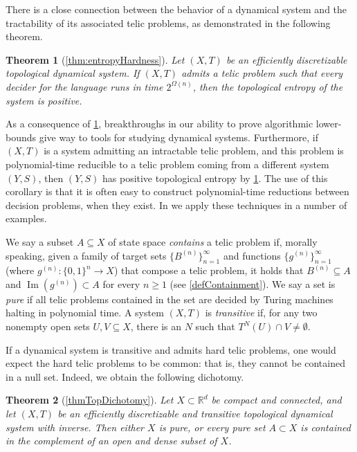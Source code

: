 \documentclass{amsart}
\theoremstyle{theorem}
\newtheorem{theorem}{Theorem}[section]
\theoremstyle{remark}
\numberwithin{equation}{section}
\DeclareMathOperator{\image}{Im}
\newcommand{\RR}{\mathbb{R}}
\begin{document}
There is a close connection between the behavior of a dynamical system and the tractability of its associated telic problems, as demonstrated in the following theorem.

\begin{theorem}[\cref{thm:entropyHardness}]\label{thm:entropyHardness1}
Let $(X, T)$ be an efficiently discretizable topological dynamical system. If $(X, T)$ admits a telic problem such that every decider for the language runs in time $2^{\Omega(n)}$, then the topological entropy of the system is positive.
\end{theorem}

As a consequence of \cref{thm:entropyHardness1}, breakthroughs in our ability to prove algorithmic lower-bounds give way to tools for studying dynamical systems.
Furthermore, if $(X, T)$ is a system admitting an intractable telic problem, and this problem is polynomial-time reducible to a telic problem coming from a different system $(Y, S)$, then $(Y, S)$ has positive topological entropy by \cref{thm:entropyHardness1}. The use of this corollary is that it is often easy to construct polynomial-time reductions between decision problems, when they exist.
In \cite{everett3} we apply these techniques in a number of examples.

We say a subset $A \subseteq X$ of state space \emph{contains} a telic problem if, morally speaking, given a family of target sets $\{B^{(n)}\}_{n=1}^\infty$ and functions $\{g^{(n)}\}_{n=1}^\infty$ (where $g^{(n)}:\{0,1\}^n\rightarrow X$) that compose a telic problem, it holds that $B^{(n)} \subseteq A$ and $\image(g^{(n)}) \subset A$ for every $n\geq 1$ (see \cref{defContainment}). We say a set is \emph{pure} if all telic problems contained in the set are decided by Turing machines halting in polynomial time. A system $(X, T)$ is \emph{transitive} if, for any two nonempty open sets $U, V \subseteq X$, there is an $N$ such that $T^N(U) \cap V \neq \emptyset$.

If a dynamical system is transitive and admits hard telic problems, one would expect the hard telic problems to be common: that is, they cannot be contained in a null set. Indeed, we obtain the following dichotomy.

\begin{theorem}[\cref{thmTopDichotomy}]\label{thmTopDichotomy1}
Let $X \subset \RR^d$ be compact and connected, and let $(X, T)$ be an efficiently discretizable and transitive topological dynamical system with inverse.
Then either $X$ is pure, or every pure set $A \subset X$ is contained in the complement of an open and dense subset of $X$.
\end{theorem}
\end{document}

